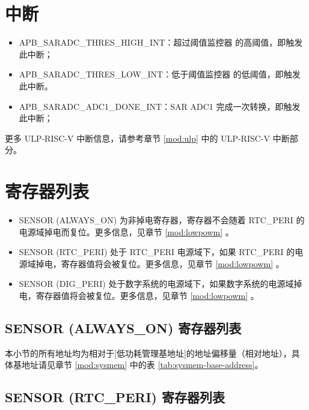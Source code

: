 \documentclass[main\_\_CN.tex]{subfiles}
\begin{document}
\section{中断}

\begin{itemize}
    \item \label{interreupt:APBSARADCTHRESxHIGHINT} APB\_SARADC\_THRES\_HIGH\_INT：超过阈值监控器  的高阈值，即触发此中断；
    \item \label{interreupt:APBSARADCTHRESxLOWINT} APB\_SARADC\_THRES\_LOW\_INT：低于阈值监控器  的低阈值，即触发此中断。
   \item \label{interreupt:SARADCDONEINT1}APB\_SARADC\_ADC1\_DONE\_INT：SAR ADC1 完成一次转换，即触发此中断；
\end{itemize}
更多 ULP-RISC-V 中断信息，请参考章节 \ref{mod:ulp} \textit{}中的 ULP-RISC-V 中断部分。
\hypertarget{sensor-reg-summ}{}
\section{寄存器列表}

\begin{itemize}
   \item SENSOR (ALWAYS\_ON) 为非掉电寄存器，寄存器不会随着 RTC\_PERI 的电源域掉电而复位。更多信息，见章节 \ref{mod:lowpowm} \textit{}。
    \item SENSOR (RTC\_PERI) 处于 RTC\_PERI 电源域下，如果 RTC\_PERI 的电源域掉电，寄存器值将会被复位。更多信息，见章节 \ref{mod:lowpowm} \textit{}。
    \item SENSOR (DIG\_PERI) 处于数字系统的电源域下，如果数字系统的电源域掉电，寄存器值将会被复位。更多信息，见章节 \ref{mod:lowpowm} \textit{}。
\end{itemize}

\subsection{SENSOR (ALWAYS\_ON) 寄存器列表}

本小节的所有地址均为相对于[低功耗管理基地址]的地址偏移量（相对地址），具体基地址请见章节 \ref{mod:sysmem} \textit{} 中的表 \ref{tab:sysmem-base-address}。



\subsection{SENSOR (RTC\_PERI) 寄存器列表}
\end{document}
